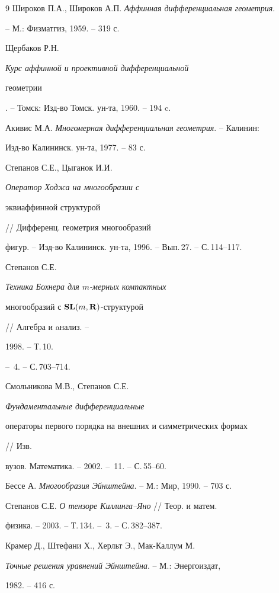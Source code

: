 \begin{thebibliography}{9}
Широков П.А., Широков А.П. {\em Аффинная дифференциальная геометрия}.


-- М.: Физматгиз, 1959. -- 319 с. 




Щербаков Р.Н. {\em Курс аффинной и проективной дифференциальной 


геометрии}. -- Томск: Изд-во Томск. ун-та, 1960. -- 194 c. 




Акивис М.А. {\em Многомерная дифференциальная геометрия}. -- Калинин: 


Изд-во Калининск. ун-та, 1977. -- 83 с. 




Степанов С.Е., Цыганок И.И. {\em Оператор Ходжа на многообразии с 


эквиаффинной структурой} // Дифференц. геометрия многообразий 


фигур. -- Изд-во Калининск. ун-та, 1996. -- Вып.\,27. -- С.\,114--117. 




Степанов С.Е. {\em Техника Бохнера для $m$-мерных компактных 


многообразий с $\bold {SL}(m,\bold R)$-структурой} // Алгебра и aнализ. -- 


1998. -- Т.\,10. 


-- \No\,4. -- С.\,703--714. 




Смольникова М.В., Степанов С.Е. {\em Фундаментальные дифференциальные 


операторы первого порядка на внешних и симметрических формах} // Изв. 


вузов. Математика. -- 2002. -- \No\,11. -- С.\,55--60. 




Бессе А. {\em Многообразия Эйнштейна}. -- М.: Мир, 1990. -- 703 с. 




Степанов С.Е. {\em О тензоре Киллинга--Яно} // Теор. и матем. 


физика. -- 2003. -- Т.\,134. -- \No\,3. -- С.\,382--387. 




Крамер Д., Штефани Х., Херльт Э., Мак-Каллум М. 


{\em Точные решения уравнений Эйнштейна}. -- М.: Энергоиздат, 


1982. -- 416 с. 



\end{thebibliography}
